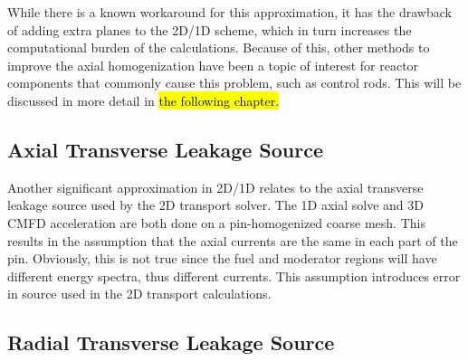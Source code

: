 While there is a known workaround for this approximation, it has the drawback of adding extra planes to the 2D/1D scheme, which in turn increases the computational burden of the calculations.  Because of this, other methods to improve the axial homogenization have been a topic of interest for reactor components that commonly cause this problem, such as control rods.  This will be discussed in more detail in \hl{the following chapter.}

\subsection{Axial Transverse Leakage Source}

Another significant approximation in 2D/1D relates to the axial transverse leakage source used by the 2D transport solver.  The 1D axial solve and 3D CMFD acceleration are both done on a pin-homogenized coarse mesh.  This results in the assumption that the axial currents are the same in each part of the pin.  Obviously, this is not true since the fuel and moderator regions will have different energy spectra, thus different currents.  This assumption introduces error in source used in the 2D transport calculations.

\subsection{Radial Transverse Leakage Source}